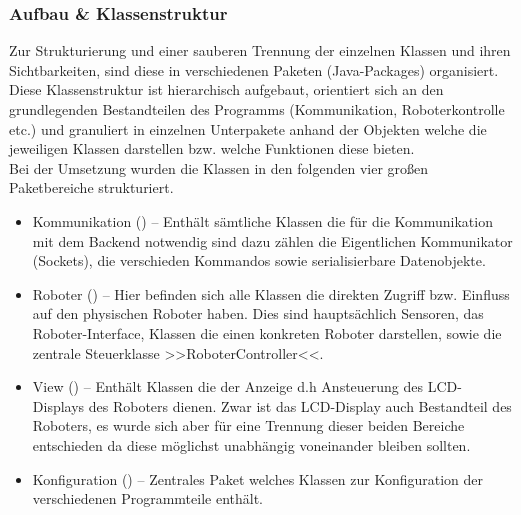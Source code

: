 \subsubsection{Aufbau \& Klassenstruktur}
Zur Strukturierung und einer sauberen Trennung der einzelnen Klassen und ihren Sichtbarkeiten, sind diese in verschiedenen 
Paketen (Java-Packages) organisiert. Diese Klassenstruktur ist hierarchisch aufgebaut, orientiert sich an den grundlegenden 
Bestandteilen des Programms (Kommunikation, Roboterkontrolle etc.) und granuliert in einzelnen Unterpakete anhand der Objekten 
welche die jeweiligen Klassen darstellen bzw. welche Funktionen diese bieten. \\
Bei der Umsetzung wurden die Klassen in den folgenden vier großen Paketbereiche strukturiert.
\begin{itemize}
	\item{Kommunikation ()} -- Enthält sämtliche Klassen die für die Kommunikation mit dem
	Backend notwendig sind dazu zählen die Eigentlichen Kommunikator (Sockets), die verschieden Kommandos sowie serialisierbare 
	Datenobjekte.
	\item{Roboter ()} -- Hier befinden sich alle Klassen die direkten Zugriff bzw. Einfluss auf den 
	physischen Roboter haben. Dies sind hauptsächlich Sensoren, das Roboter-Interface, Klassen die einen konkreten Roboter darstellen, 
	sowie die zentrale Steuerklasse >>RoboterController<<.
	\item{View ()} -- Enthält Klassen die der Anzeige d.h Ansteuerung des LCD-Displays des
	Roboters dienen. Zwar ist das LCD-Display auch Bestandteil des Roboters, es wurde sich aber für eine Trennung dieser beiden 
	Bereiche entschieden da diese möglichst unabhängig voneinander bleiben sollten.
	\item{Konfiguration ()} -- Zentrales Paket welches Klassen zur Konfiguration 
	der verschiedenen Programmteile enthält.
\end{itemize}
